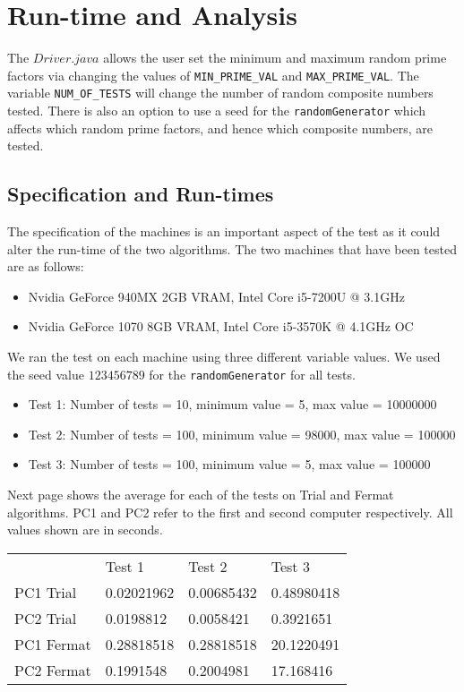 \documentclass[]{article}
\begin{document}
\section{Run-time and Analysis}
The $Driver.java$ allows the user set the minimum and maximum random prime factors via changing the values of \lstinline|MIN_PRIME_VAL| and \lstinline|MAX_PRIME_VAL|. The variable \lstinline|NUM_OF_TESTS| will change the number of random composite numbers tested. There is also an option to use a seed for the \lstinline|randomGenerator| which affects which random prime factors, and hence which composite numbers, are tested.

\subsection{Specification and Run-times}
The specification of the machines is an important aspect of the test as it could alter the run-time of the two algorithms. The two machines that have been tested are as follows:
\begin{itemize}
	\item Nvidia GeForce 940MX 2GB VRAM, Intel Core i5-7200U @ 3.1GHz
	\item Nvidia GeForce 1070 8GB VRAM, Intel Core i5-3570K @ 4.1GHz OC
\end{itemize}
We ran the test on each machine using three different variable values. We used the seed value $123456789$ for the \lstinline|randomGenerator| for all tests.

\pagebreak
\begin{itemize}
	\item Test 1: Number of tests = 10, minimum value = 5, max value = 10000000
	\item Test 2: Number of tests = 100, minimum value = 98000, max value = 100000
	\item Test 3: Number of tests = 100, minimum value = 5, max value = 100000
\end{itemize}
Next page shows the average for each of the tests on Trial and Fermat algorithms. PC1 and PC2 refer to the first and second computer respectively. All values shown are in seconds.

\begin{table}[!h]
	\begin{tabular}{llll}
		& Test 1  & Test 2  & Test 3  \\
		PC1 Trial  & 0.02021962 & 0.00685432 & 0.48980418 \\
		PC2 Trial  & 0.0198812  & 0.0058421  & 0.3921651  \\
		PC1 Fermat & 0.28818518 & 0.28818518 & 20.1220491 \\
		PC2 Fermat & 0.1991548  & 0.2004981  & 17.168416 
	\end{tabular}
	

\end{table}
\end{document}
